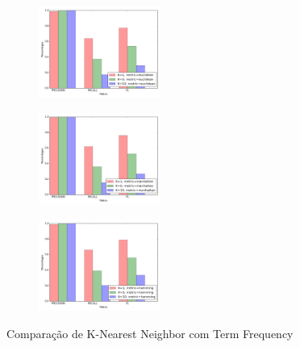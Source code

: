 \begin{figure}[H]
	\centering
	\begin{subfigure}{.3\textwidth}
		\centering
		\includegraphics[height=3cm]{images/knear_tf_idf_euclidean}
	\end{subfigure}
	\begin{subfigure}{.3\textwidth}
		\centering
		\includegraphics[height=3cm]{images/knear_tf_idf_manhattan}
	\end{subfigure}
	\begin{subfigure}{.3\textwidth}
		\centering
		\includegraphics[height=3cm]{images/knear_tf_idf_hamming}
	\end{subfigure}
	\caption{Comparação de K-Nearest Neighbor com Term Frequency}
	\label{fig:knear_tf_idf}
\end{figure}